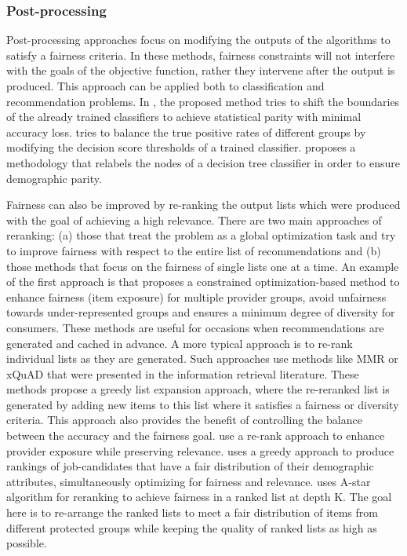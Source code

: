 \subsubsection{Post-processing}
Post-processing approaches focus on modifying the outputs of the algorithms to satisfy a fairness criteria. In these methods, fairness constraints will not interfere with the goals of the objective function, rather they intervene after the output is produced. This approach can be applied both to classification and recommendation problems.
In \cite{fish2016confidence}, the proposed method tries to shift the boundaries of the already trained classifiers to achieve statistical parity with minimal accuracy loss. \cite{hardt2016equality} tries to balance the true positive rates of different groups by modifying the decision score thresholds of a trained classifier. \cite{kamiran2010discrimination} proposes a methodology that relabels the nodes of a decision tree classifier in order to ensure demographic parity.

Fairness can also be improved by re-ranking the output lists which were produced with the goal of achieving a high relevance. There are two main approaches of reranking: (a) those that treat the problem as a global optimization task and try to improve fairness with respect to the entire list of recommendations and (b) those methods that focus on the fairness of single lists one at a time.
An example of the first approach is \cite{surer2018multistakeholder} that proposes a constrained optimization-based method to enhance fairness (item exposure) for multiple provider groups, avoid unfairness towards under-represented groups and ensures a minimum degree of diversity for consumers. These methods are useful for occasions when recommendations are generated and cached in advance.
A more typical approach is to re-rank individual lists as they are generated. Such approaches use methods like MMR \cite{carbonell1998use} or xQuAD \cite{santos2010explicit} that were presented in the information retrieval literature. These methods propose a greedy list expansion approach, where the re-reranked list is generated by adding new items to this list where it satisfies a fairness or diversity criteria. This approach also provides the benefit of controlling the balance between the accuracy and the fairness goal. 
\cite{modani2017fairness} use a re-rank approach to enhance provider exposure while preserving relevance. \cite{Geyik2019} uses a greedy approach to produce rankings of job-candidates that have a fair distribution of their demographic attributes, simultaneously optimizing for fairness and relevance. \cite{zehlike2017fa} uses A-star algorithm for reranking to achieve fairness in a ranked list at depth K. The goal here is to re-arrange the ranked lists to meet a fair distribution of items from different protected groups while keeping the quality of ranked lists as high as possible. 

